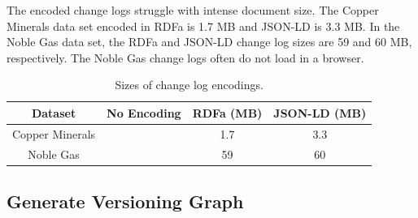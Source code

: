 The encoded change logs struggle with intense document size.
The Copper Minerals data set encoded in RDFa is 1.7 MB and JSON-LD is 3.3 MB.
In the Noble Gas data set, the RDFa and JSON-LD change log sizes are 59 and 60 MB, respectively.
The Noble Gas change logs often do not load in a browser.

\begin{table}[b]
	\caption{Sizes of change log encodings.}
	\label{changelog_table}
	\centering
	\begin{tabular}{|c|c|c|c|}
		\hline
		Dataset & No Encoding & RDFa (MB) & JSON-LD (MB) \\
		\hline
		Copper Minerals &  & 1.7 & 3.3 \\
		Noble Gas &  & 59 & 60 \\
		\hline
	\end{tabular}
\end{table}

\subsection{Generate Versioning Graph}

